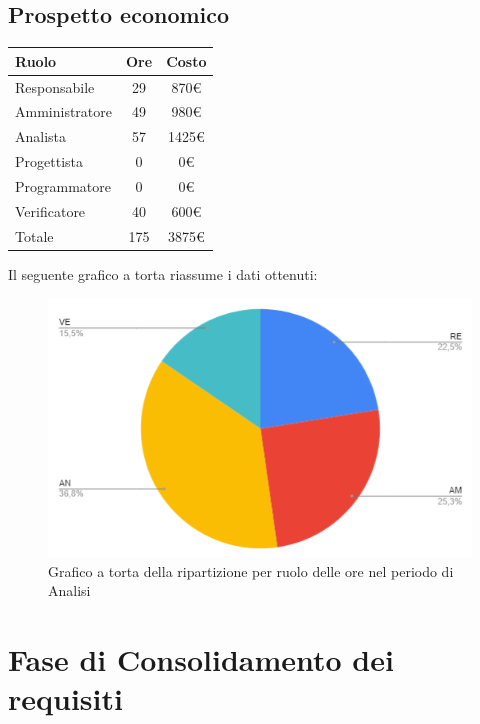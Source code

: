 {\subsection{Prospetto economico}\label{PreventivoFaseDiAnalisiProspettoEconomico}
\quad
\def\tabularxcolumn#1{m{#1}}
{
	\begin{center}
		\renewcommand{\arraystretch}{1.4}
		\begin{tabularx}{7cm}{|X|c|c|}
			\hline
			\rowcolor{airforceblue}
			\textbf{Ruolo} & \textbf{Ore} & \textbf{Costo}\\
			\hline
			Responsabile & 29 & 870\euro\\
			\hline
			Amministratore & 49 & 980\euro\\
			\hline
			Analista & 57 & 1425\euro\\
			\hline
			Progettista & 0 & 0\euro\\
			\hline
			Programmatore & 0 & 0\euro\\
			\hline
			Verificatore & 40 & 600\euro\\
			\hline
			Totale & 175 & 3875\euro\\
			\hline
		\end{tabularx}
	\end{center}
Il seguente grafico a torta riassume i dati ottenuti:
\begin{figure}[!ht]
	\begin{center}
		\includegraphics[width=0.8\linewidth]{../immagini/pdp/torta_analisi.png}
		\caption{Grafico a torta della ripartizione per ruolo delle ore nel periodo di Analisi}
	\end{center}
\end{figure}
\clearpage
\section{Fase di Consolidamento dei requisiti}\label{PreventivoFaseDiConsolidamentoDeiRequisiti}

}}
